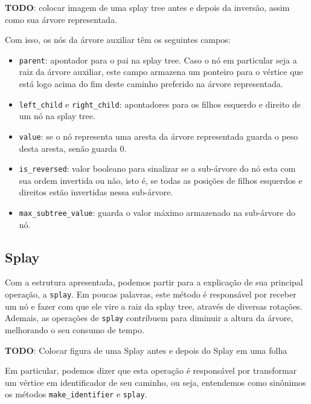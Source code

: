 \begin{center}
    \textbf{TODO}: colocar imagem de uma splay tree antes e depois da inversão, assim como sua árvore representada.
\end{center}

Com isso, os nós da árvore auxiliar têm os seguintes campos:

\begin{itemize}
    \item \texttt{parent}: apontador para o pai na splay tree. Caso o nó em particular seja a raiz da árvore auxiliar, este campo armazena um ponteiro para o vértice que está logo acima do fim deste caminho preferido na árvore representada.
    \item \texttt{left\_child} e \texttt{right\_child}: apontadores para os filhos esquerdo e direito de um nó na splay tree.
    \item \texttt{value}: se o nó representa uma aresta da árvore representada guarda o peso desta aresta, senão guarda 0.
    \item \texttt{is\_reversed}: valor booleano para sinalizar se a sub-árvore do nó esta com sua ordem invertida ou não, isto é, se todas as posições de filhos esquerdos e direitos estão  invertidas nessa  sub-árvore.
    \item \texttt{max\_subtree\_value}: guarda o valor máximo armazenado na sub-árvore do nó.
\end{itemize}

\subsection{Splay}
\label{subsection:lct-splay-splay}

Com a estrutura apresentada, podemos partir para a explicação de sua principal operação, a \texttt{splay}. Em poucas palavras, este método é responsável por receber um nó e fazer com que ele vire a raiz da splay tree, através de diversas rotações.  Ademais, as operações de \texttt{splay} contribuem para diminuir a altura da árvore, melhorando o seu consumo de tempo.

\begin{center}
    \textbf{TODO}: Colocar figura de uma Splay antes e depois do Splay em uma folha
\end{center}

Em particular, podemos dizer que esta operação é responsável por transformar um vértice em identificador de seu caminho, ou seja, entendemos como sinônimos os métodos \texttt{make\_identifier} e \texttt{splay}.


